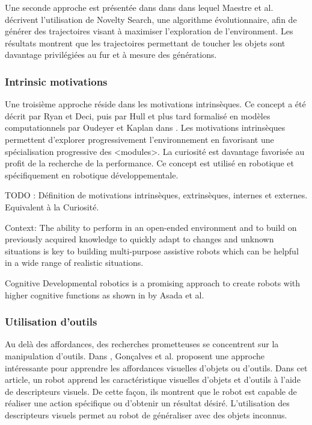 \documentclass{llncs}
\begin{document}
Une seconde approche est présentée dans dans \cite{Maestre2015} dans lequel Maestre et al. décrivent l'utilisation de Novelty Search, une algorithme évolutionnaire, afin de générer des trajectoires visant à maximiser l'exploration de l'environment. Les résultats montrent que les trajectoires permettant de toucher les objets sont davantage privilégiées au fur et à mesure des générations.

\subsubsection{Intrinsic motivations}
Une troisième approche réside dans les motivations intrinsèques. Ce concept a été décrit par Ryan et Deci, puis par Hull et plus tard formalisé en modèles computationnels par Oudeyer et Kaplan dans \cite{10.3389/neuro.12.006.2007}. Les motivations intrinsèques permettent d'explorer progressivement l'environnement en favorisant une spécialisation progressive des <modules>. La curiosité est davantage favorisée au profit de la recherche de la performance. Ce concept est utilisé en robotique et spécifiquement en robotique développementale.

TODO : Définition de motivations intrinsèques, extrinsèques, internes et externes. Equivalent à la Curiosité.



Context: The ability to perform in an open-ended environment and to build on previously acquired knowledge to quickly adapt to changes and unknown situations is key to building
multi-purpose assistive robots which can be helpful in a wide range of realistic situations.

Cognitive Developmental robotics is a promising approach to create robots with higher cognitive functions as shown in \cite{Asada2009} by Asada et al.

\subsubsection{Utilisation d'outils}
Au delà des affordances, des recherches prometteuses se concentrent sur la manipulation d'outils. Dans \cite{Goncalves2014}, Gonçalves et al. proposent une approche intéressante pour apprendre les affordances visuelles d'objets ou d'outils. Dans cet article, un robot apprend les caractéristique visuelles d'objets et d'outils à l'aide de descripteurs visuels. De cette façon, ils montrent que le robot est capable de réaliser une action spécifique ou d'obtenir un résultat désiré. L'utilisation des descripteurs visuels permet au robot de généraliser avec des objets inconnus.
\end{document}
